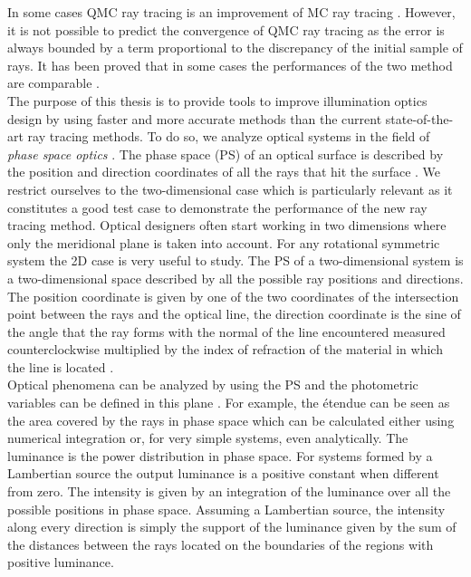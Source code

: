 In some cases QMC ray tracing is an improvement of MC ray tracing \cite{ohbuchi1996quasi, caflisch1998monte}. However, it is not possible to predict the convergence of QMC ray tracing as the error is always bounded by a term proportional to the discrepancy of the initial sample of rays. It has been proved that in some cases the performances of the two method are comparable \cite{tuffin2004randomization}. 
\\ \indent The purpose of this thesis is to provide tools to improve illumination optics design by using faster and more accurate methods than the current state-of-the-art ray tracing methods.
To do so, we analyze optical systems in the field of \textit{phase space optics} \cite{torre2005linear}.
The phase space (PS) of an optical surface is described by the position and direction coordinates of all the rays that hit the surface \cite{testorf2009phase}. We restrict ourselves to the two-dimensional case which is particularly relevant as it constitutes a good test case to
demonstrate the performance of the new ray tracing method.
Optical designers often start working in two dimensions where only the
meridional plane is taken into account. For any rotational symmetric
system the 2D case is very useful to study. 
The PS of a two-dimensional system is a two-dimensional space described by all the possible ray positions and directions. The position coordinate is given by one of the two coordinates of the intersection point between the rays and the optical line, the direction coordinate is the sine of the angle that the ray forms with the normal of the line encountered measured counterclockwise multiplied by the index of refraction of the material in which the line is located \cite{wolf2004geometric}. 
\\ \indent Optical phenomena can be analyzed by using the PS and the photometric variables can be defined in this plane \cite{rausch2014illumination}.  
For example, the \'{e}tendue can be seen as the area covered by the rays in phase space which can be calculated either using numerical integration or, for very simple systems, even analytically. The luminance is the power distribution in phase space. For systems formed by a Lambertian source the output luminance is a positive constant when different from zero. The intensity is given by an integration of the luminance over all the possible positions in phase space. Assuming a Lambertian source, the intensity along every direction is simply the support of the luminance given by the sum of the distances between the rays located on the boundaries of the regions with positive luminance. 
